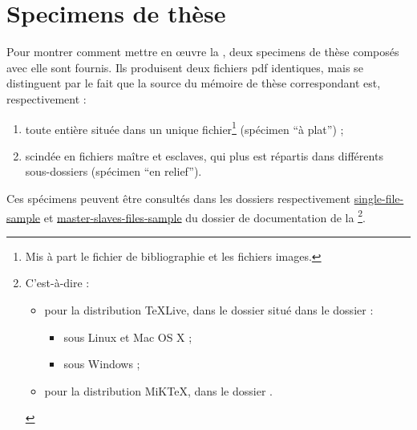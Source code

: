 \chapter{Specimens de thèse}\label{cha:specimen}

Pour montrer comment mettre en œuvre la \yatcl, deux specimens de thèse
composés avec elle sont fournis.  Ils produisent deux fichiers \gls{pdf}
identiques, mais se distinguent par le fait que la source  du
mémoire de thèse correspondant est, respectivement :
\begin{enumerate}
\item toute entière située dans un unique fichier\footnote{Mis à part le
    fichier de bibliographie et les fichiers images.} (spécimen \enquote{à
    plat}) ;
\item scindée en fichiers maître et esclaves, qui plus est répartis dans
  différents sous-dossiers (spécimen \enquote{en relief}).
\end{enumerate}

Ces spécimens peuvent être consultés dans les dossiers respectivement
\href{single-file-sample/.}{single-file-sample} et
\href{master-slaves-files-sample/.}{master-slaves-files-sample} du dossier
de documentation de la \yatcl{}\footnote{C'est-à-dire :
  \begin{itemize}
  \item pour la distribution \TeX Live, dans le dossier
    \tldistdirectory\jobdocdirectory{} situé dans le dossier :
    \begin{itemize}
    \item \unixtldirectory{} sous Linux et Mac OS X ;
    \item \wintldirectory{} sous Windows ;
    \end{itemize}
  \item pour la distribution MiK\TeX, dans le dossier \miktexdistdirectory.
  \end{itemize}
}.


